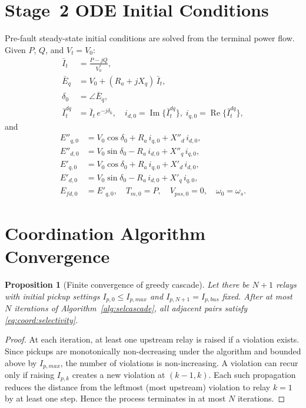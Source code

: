 \documentclass[12pt,a4paper]{article}
\theoremstyle{definition}
\theoremstyle{plain}
\newtheorem{proposition}{Proposition}[section]
\begin{document}
\appendix

\section{Stage~2 ODE Initial Conditions}
\label{app:ic}

Pre-fault steady-state initial conditions are solved from the terminal power
flow.  Given $P$, $Q$, and $V_t = V_0$:
\begin{align}
  \bar{I}_t  &= \frac{P - jQ}{V_0^*}, \\
  \bar{E}_q  &= V_0 + (R_a + jX_q)\,\bar{I}_t, \\
  \delta_0   &= \angle\bar{E}_q, \\
  \bar{I}_t^{dq} &= \bar{I}_t\,e^{-j\delta_0},
  \quad i_{d,0} = \operatorname{Im}\{\bar{I}_t^{dq}\},\;
        i_{q,0} = \operatorname{Re}\{\bar{I}_t^{dq}\},
\end{align}
and
\begin{align}
  E''_{q,0} &= V_0\cos\delta_0 + R_a\,i_{q,0} + X''_d\,i_{d,0}, \\
  E''_{d,0} &= V_0\sin\delta_0 - R_a\,i_{d,0} + X''_q\,i_{q,0}, \\
  E'_{q,0}  &= V_0\cos\delta_0 + R_a\,i_{q,0} + X'_d\,i_{d,0}, \\
  E'_{d,0}  &= V_0\sin\delta_0 - R_a\,i_{d,0} + X'_q\,i_{q,0}, \\
  E_{fd,0}  &= E'_{q,0}, \quad T_{m,0} = P, \quad V_{pss,0} = 0, \quad \omega_0 = \omega_s.
\end{align}

\section{Coordination Algorithm Convergence}
\label{app:conv}

\begin{proposition}[Finite convergence of greedy cascade]
\label{prop:conv}
Let there be $N+1$ relays with initial pickup settings
$I_{p,0} \leq I_{p,max}$ and $I_{p,N+1} = I_{p,bus}$ fixed.  After at most
$N$ iterations of Algorithm~\ref{alg:selcascade}, all adjacent pairs satisfy
\cref{eq:coord:selectivity}.
\end{proposition}

\begin{proof}
At each iteration, at least one upstream relay is raised if a violation exists.
Since pickups are monotonically non-decreasing under the algorithm and bounded
above by $I_{p,max}$, the number of violations is non-increasing.  A violation
can recur only if raising $I_{p,k}$ creates a new violation at $(k-1, k)$.
Each such propagation reduces the distance from the leftmost (most upstream)
violation to relay $k=1$ by at least one step.  Hence the process terminates
in at most $N$ iterations.
\end{proof}
\end{document}
